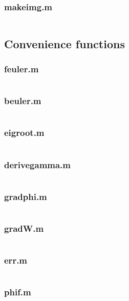 \subsubsection*{makeimg.m}
\inputminted[linenos]{matlab}{makeimg.m}



\subsection*{Convenience functions}
\subsubsection*{feuler.m}
\inputminted[linenos]{matlab}{feuler.m}

\subsubsection*{beuler.m}
\inputminted[linenos]{matlab}{beuler.m}

\subsubsection*{eigroot.m}
\inputminted[linenos]{matlab}{eigroot.m}

\subsubsection*{derivegamma.m}
\inputminted[linenos]{matlab}{derivegamma.m}

\subsubsection*{gradphi.m}
\inputminted[linenos]{matlab}{gradphi.m}

\subsubsection*{gradW.m}
\inputminted[linenos]{matlab}{gradW.m}

\subsubsection*{err.m}
\inputminted[linenos]{matlab}{err.m}

\subsubsection*{phif.m}
\inputminted[linenos]{matlab}{phif.m}



